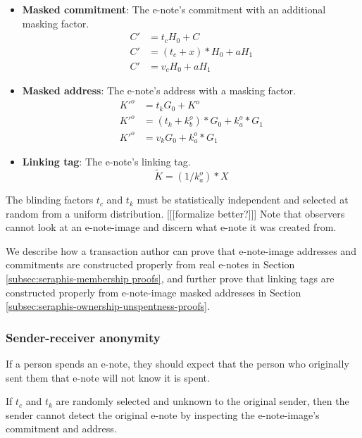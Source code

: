 \begin{itemize}
    \item \textbf{Masked commitment}: The e-note's commitment with an additional masking factor.\vspace{.115cm}
    \begin{align*}
        C' &= t_c H_0 + C \\
        C' &= (t_c + x)*H_0 + a H_1 \\
        C' &= v_c H_0 + a H_1
    \end{align*}

    \item \textbf{Masked address}: The e-note's address with a masking factor.\vspace{.115cm}
    \begin{align*}
        K'^o &= t_k G_0 + K^o \\
        K'^o &= (t_k + k^o_b)*G_0 + k^o_a*G_1 \\
        K'^o &= v_k G_0 + k^o_a*G_1
    \end{align*}

    \item \textbf{Linking tag}: The e-note's linking tag.\vspace{.115cm}
    \[\tilde{K} = (1/k^o_a)*X\]
\end{itemize}

The blinding factors $t_c$ and $t_k$ must be statistically independent and selected at random from a uniform distribution. [[[formalize better?]]] Note that observers cannot look at an e-note-image and discern what e-note it was created from.

We describe how a transaction author can prove that e-note-image addresses and commitments are constructed properly from real e-notes in Section \ref{subsec:seraphis-membership proofs}, and further prove that linking tags are constructed properly from e-note-image masked addresses in Section \ref{subsec:seraphis-ownership-unspentness-proofs}.

\subsubsection{Sender-receiver anonymity}
\label{subsubsec:e-note-images-sender-receiver-anonymity}

If a person spends an e-note, they should expect that the person who originally sent them that e-note will not know it is spent.

If $t_c$ and $t_k$ are randomly selected and unknown to the original sender, then the sender cannot detect the original e-note by inspecting the e-note-image's commitment and address.

